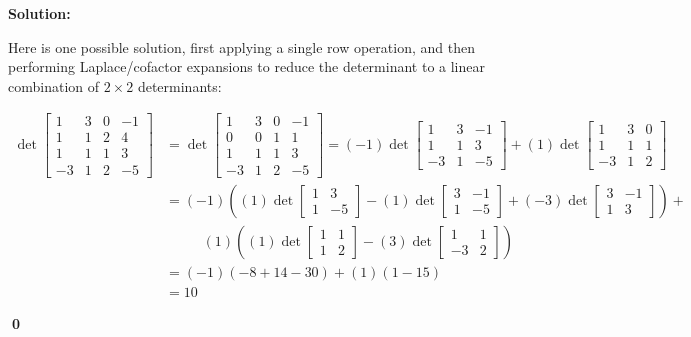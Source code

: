 \documentclass{article}
\newenvironment{solution}
{
  \ignorespaces
  \textbf{Solution:}
}
{
  \ignorespacesafterend
  \begin{flushright}
  {\bfseries \qed}
  \end{flushright}
}
\begin{document}
\begin{solution}
Here is one possible solution, first applying a single row operation,
 and then performing Laplace/cofactor expansions to reduce the determinant
 to a linear combination of \(2\times 2\) determinants:

 \begin{align*}
\det
   \begin{bmatrix}
     1 & 3 & 0 & -1 \\
     1 & 1 & 2 & 4 \\
     1 & 1 & 1 & 3 \\
     -3 & 1 & 2 & -5
   \end{bmatrix}
 &= \det \begin{bmatrix} 1 & 3 & 0 & -1 \\ 0 & 0 & 1 & 1 \\ 1 & 1 & 1 & 3 \\ -3 & 1 & 2 & -5 \end{bmatrix} =
 (-1) \det \begin{bmatrix} 1 & 3 & -1 \\ 1 & 1 & 3 \\ -3 & 1 & -5 \end{bmatrix} + (1) \det \begin{bmatrix} 1 & 3 & 0 \\ 1 & 1 & 1 \\ -3 & 1 & 2 \end{bmatrix} \\
 &= (-1) \left( (1) \det \begin{bmatrix} 1 & 3 \\ 1 & -5 \end{bmatrix} - (1) \det \begin{bmatrix} 3 & -1 \\ 1 & -5 \end{bmatrix} + (-3) \det \begin{bmatrix} 3 & -1 \\ 1 & 3 \end{bmatrix} \right) + \\
 &\phantom{==} (1) \left( (1) \det \begin{bmatrix} 1 & 1 \\ 1 & 2 \end{bmatrix} - (3) \det \begin{bmatrix} 1 & 1 \\ -3 & 2 \end{bmatrix} \right) \\
 &= (-1) \left( -8+14-30 \right) + (1) \left(1-15 \right) \\
 &=10
 \end{align*}


\end{solution}
\end{document}
